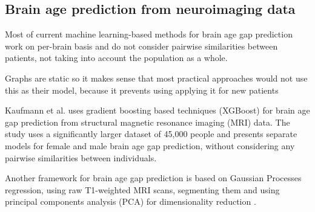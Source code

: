 \subsection{Brain age prediction from neuroimaging data}
Most of current machine learning-based methods for brain age gap prediction work on per-brain basis and do not consider pairwise similarities between patients, not taking into account the population as a whole.

Graphs are static so it makes sense that most practical approaches would not use this as their model, because it prevents using applying it for new patients

Kaufmann et al. \cite{kaufmann2019} uses gradient boosting based techniques (XGBoost) \cite{chen2016xgboost} for brain age gap prediction from structural magnetic resonance imaging (MRI) data. The study uses a significantly larger dataset of 45,000 people and presents separate models for female and male brain age gap prediction, without considering any pairwise similarities between individuals.

Another framework for brain age gap prediction is based on Gaussian Processes regression, using raw T1-weighted MRI scans, segmenting them and using principal components analysis (PCA) for dimensionality reduction \cite{cole2018brain}.
